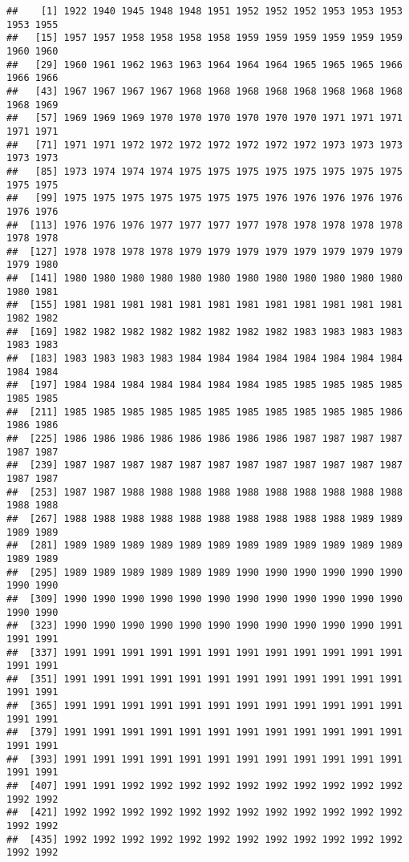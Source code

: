 \documentclass[
]{article}
\begin{document}
\begin{verbatim}
##    [1] 1922 1940 1945 1948 1948 1951 1952 1952 1952 1953 1953 1953 1953 1955
##   [15] 1957 1957 1958 1958 1958 1958 1959 1959 1959 1959 1959 1959 1960 1960
##   [29] 1960 1961 1962 1963 1963 1964 1964 1964 1965 1965 1965 1966 1966 1966
##   [43] 1967 1967 1967 1967 1968 1968 1968 1968 1968 1968 1968 1968 1968 1969
##   [57] 1969 1969 1969 1970 1970 1970 1970 1970 1970 1971 1971 1971 1971 1971
##   [71] 1971 1971 1972 1972 1972 1972 1972 1972 1972 1973 1973 1973 1973 1973
##   [85] 1973 1974 1974 1974 1975 1975 1975 1975 1975 1975 1975 1975 1975 1975
##   [99] 1975 1975 1975 1975 1975 1975 1975 1976 1976 1976 1976 1976 1976 1976
##  [113] 1976 1976 1976 1977 1977 1977 1977 1978 1978 1978 1978 1978 1978 1978
##  [127] 1978 1978 1978 1978 1979 1979 1979 1979 1979 1979 1979 1979 1979 1980
##  [141] 1980 1980 1980 1980 1980 1980 1980 1980 1980 1980 1980 1980 1980 1981
##  [155] 1981 1981 1981 1981 1981 1981 1981 1981 1981 1981 1981 1981 1982 1982
##  [169] 1982 1982 1982 1982 1982 1982 1982 1982 1983 1983 1983 1983 1983 1983
##  [183] 1983 1983 1983 1983 1984 1984 1984 1984 1984 1984 1984 1984 1984 1984
##  [197] 1984 1984 1984 1984 1984 1984 1984 1985 1985 1985 1985 1985 1985 1985
##  [211] 1985 1985 1985 1985 1985 1985 1985 1985 1985 1985 1985 1986 1986 1986
##  [225] 1986 1986 1986 1986 1986 1986 1986 1986 1987 1987 1987 1987 1987 1987
##  [239] 1987 1987 1987 1987 1987 1987 1987 1987 1987 1987 1987 1987 1987 1987
##  [253] 1987 1987 1988 1988 1988 1988 1988 1988 1988 1988 1988 1988 1988 1988
##  [267] 1988 1988 1988 1988 1988 1988 1988 1988 1988 1988 1989 1989 1989 1989
##  [281] 1989 1989 1989 1989 1989 1989 1989 1989 1989 1989 1989 1989 1989 1989
##  [295] 1989 1989 1989 1989 1989 1989 1990 1990 1990 1990 1990 1990 1990 1990
##  [309] 1990 1990 1990 1990 1990 1990 1990 1990 1990 1990 1990 1990 1990 1990
##  [323] 1990 1990 1990 1990 1990 1990 1990 1990 1990 1990 1990 1991 1991 1991
##  [337] 1991 1991 1991 1991 1991 1991 1991 1991 1991 1991 1991 1991 1991 1991
##  [351] 1991 1991 1991 1991 1991 1991 1991 1991 1991 1991 1991 1991 1991 1991
##  [365] 1991 1991 1991 1991 1991 1991 1991 1991 1991 1991 1991 1991 1991 1991
##  [379] 1991 1991 1991 1991 1991 1991 1991 1991 1991 1991 1991 1991 1991 1991
##  [393] 1991 1991 1991 1991 1991 1991 1991 1991 1991 1991 1991 1991 1991 1991
##  [407] 1991 1991 1992 1992 1992 1992 1992 1992 1992 1992 1992 1992 1992 1992
##  [421] 1992 1992 1992 1992 1992 1992 1992 1992 1992 1992 1992 1992 1992 1992
##  [435] 1992 1992 1992 1992 1992 1992 1992 1992 1992 1992 1992 1992 1992 1992

\end{verbatim}
\end{document}
